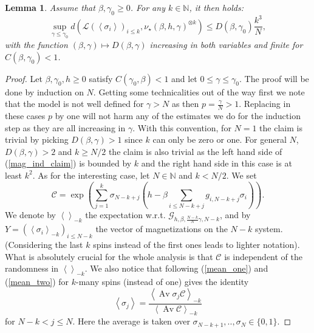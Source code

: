 \documentclass[a4paper,12pt,oneside,reqno]{amsart}
\numberwithin{equation}{section}
\newtheorem{lem}[teor]{Lemma}
\begin{document}
\begin{lem}\label{mag_ind}
Assume that ${\beta},\gamma_0\geq 0$.  For any $k \in {\mathbb{N}}$, it then holds:  
\begin{equation}\label{mag_ind_claim}
\sup\limits_{\gamma\leq \gamma_0} d\left(\mathcal{L} \left(\left<{\sigma}_i\right>\right)_{i\leq k},\nu_\star\left({\beta},h,\gamma \right)^{\otimes k}\right)\leq D({\beta},\gamma_0) \frac{k^3}{N},
\end{equation}
with the function $(\beta, \gamma) \mapsto D({\beta},\gamma)$ increasing in both variables and finite for $C({\beta}, \gamma_0)<1$. 
\end{lem}
\begin{proof}
Let $\beta,\gamma_0,h\geq 0$ satisfy $C(\gamma_0,{\beta})<1$ and let $0\leq \gamma\leq\gamma_0$. The proof will be done by induction on $N$. Getting some technicalities out of the way first we note that the model is not well defined for $\gamma>N$ as then $p= \frac{\gamma}{N}>1$. Replacing in these cases $p$ by one will not harm any of the estimates we do for the induction step as they are all increasing in $\gamma$. With this convention, for $N=1$ the claim is trivial by picking $D({\beta},\gamma)>1$ since $k$ can only be zero or one. For general $N$, $D({\beta},\gamma)>2$ and $k\geq N/2$ the claim is also trivial as the left hand side of (\ref{mag_ind_claim}) is bounded by $k$ and the right hand side in this case is at least $k^2$. As for the interesting case, let $N\in {\mathbb{N}}$ and $k< N/2$. We set 
$$\mathcal{C} = \exp\left(\sum\limits_{j=1}^k\sigma_{N-k+j} \left(h-\beta\sum\limits_{i\leq N-k+j}g_{i,N-k+j} \sigma_i\right)\right).$$
We denote by $\left<\right>_{-k}$ the expectation w.r.t. $\mathcal{G}_{h,\beta,\frac{N-k}{N}\gamma,N-k}$, and  by $Y = \left(\left<\sigma_i\right>_{-k}\right)_{i\leq N-k}$  the vector of magnetizations on the $N-k$ system. (Considering the last $k$ spins instead of the first ones leads to lighter notation). What is absolutely crucial for the whole analysis is that $\mathcal C$ is independent of the randomness in $\left<\right>_{-k}$. We also notice that following (\ref{mean_one}) and (\ref{mean_two}) for $k$-many spins (instead of one) gives the identity 
\begin{equation}\label{selfsim}
\left<\sigma_j\right>= \frac{\left<\operatorname{Av} \sigma_j\mathcal{C}\right>_{-k}}{\left<\operatorname{Av} \mathcal{C}\right>_{-k}}
\end{equation}
for $N-k<j\leq N$. Here the average is taken over $\sigma_{N-k+1},..,\sigma_{N}\in \{0,1\}$.


\end{proof}
\end{document}
